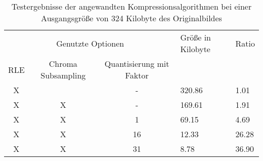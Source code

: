 \begin{table}
\centering
\begin{tabular}{|ccc|l|l|}
	\hline
	\multicolumn{3}{|c|}{Genutzte Optionen}             & Größe in Kilobyte & Ratio \\
	RLE & Chroma Subsampling & Quantisierung mit Faktor &                   &       \\
	\hline
	X   &                    & -                        & 320.86            & 1.01 \\
	X   & X                  & -                        & 169.61            & 1.91 \\
	X   & X                  & 1                        & 69.15             & 4.69 \\
	X   & X                  & 16                       & 12.33             & 26.28 \\
	X   & X                  & 31                       & 8.78              & 36.90 \\
	\hline
\end{tabular}
\caption{Testergebnisse der angewandten Kompressionsalgorithmen bei einer Ausgangsgröße von 324 Kilobyte des Originalbildes}
\label{tab:test}
\end{table}
